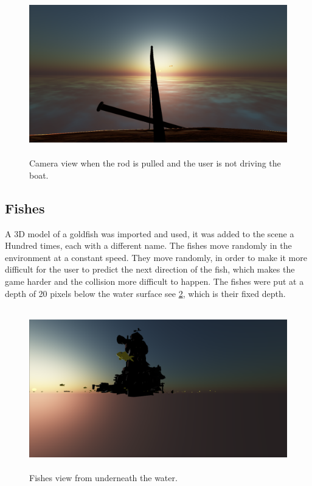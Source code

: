 \documentclass[paper=a4, fontsize=11pt]{scrartcl} %
\numberwithin{equation}{section} %
\numberwithin{figure}{section} %
\numberwithin{table}{section} %
\begin{document}
\begin{figure}[!ht]
\centering
\includegraphics[width=15cm, height=7cm]{pulledrod.png}
\caption{Camera view when the rod is pulled and the user is not driving the boat.}
\label{Urod}
\end{figure}

\newpage
\subsection{Fishes}

A 3D model of a goldfish was imported and used, it was added to the scene a Hundred times, each with a different name. The fishes move randomly in the environment at a constant speed. They move randomly, in order to make it more difficult for the user to predict the next direction of the fish, which makes the game harder and the collision more difficult to happen. The fishes were put at a depth of 20 pixels below the water surface see \ref{fishes}, which is their fixed depth. 

\begin{figure}[!ht]
\centering
\includegraphics[width=15cm, height=7cm]{fishes.png}
\caption{Fishes view from underneath the water.}
\label{fishes}
\end{figure}
\end{document}
